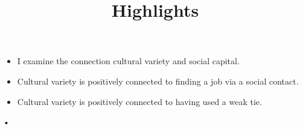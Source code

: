 \documentclass[11pt]{article}
\title{Highlights}
\begin{document}
\maketitle
\begin{itemize}
\item   I examine the connection cultural variety and social capital.
\item  Cultural variety is positively connected to finding a job via a social contact.
\item Cultural variety is positively connected to having used a weak tie.

\end{itemize}•
\end{document}
